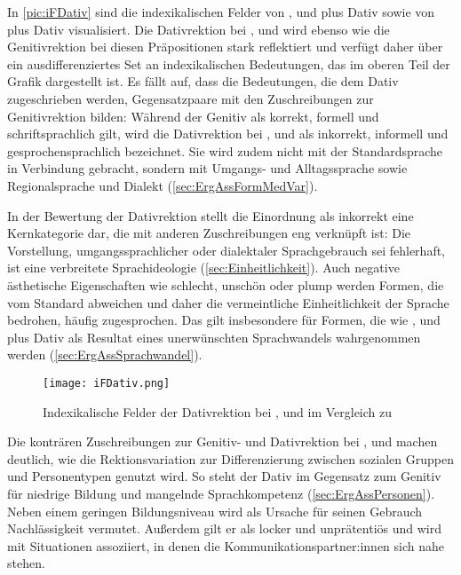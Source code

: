 In \autoref{pic:iFDativ} sind die indexikalischen Felder von \wegen, \waehrend{} und \dank{} plus Dativ sowie von \gegenueber{} plus Dativ visualisiert. 
Die Dativrektion bei \wegen, \waehrend{} und \dank{} wird ebenso wie die Genitivrektion bei diesen Präpositionen stark reflektiert und verfügt daher über ein ausdifferenziertes Set an indexikalischen Bedeutungen, das im oberen Teil der Grafik dargestellt ist. 
Es fällt auf, dass die Bedeutungen, die dem Dativ zugeschrieben werden, Gegensatzpaare mit den Zuschreibungen zur Genitivrektion bilden:
Während der Genitiv als korrekt, formell und schriftsprachlich gilt, wird die Dativrektion bei \wegen, \waehrend{} und \dank{} als inkorrekt, informell und gesprochensprachlich bezeichnet.
Sie wird zudem nicht mit der Standardsprache in Verbindung gebracht, sondern mit Umgangs- und Alltagssprache sowie Regionalsprache und Dialekt (\autoref{sec:ErgAssFormMedVar}). 

In der Bewertung der Dativrektion stellt die Einordnung als inkorrekt eine Kernkategorie dar, die mit anderen Zuschreibungen eng verknüpft ist: 
Die Vorstellung, umgangssprachlicher oder dialektaler Sprachgebrauch sei fehlerhaft, ist eine verbreitete Sprachideologie (\autoref{sec:Einheitlichkeit}). 
Auch negative ästhetische Eigenschaften wie schlecht, unschön oder plump werden Formen, die vom Standard abweichen und daher die vermeintliche Einheitlichkeit der Sprache bedrohen, häufig zugesprochen. 
Das gilt insbesondere für Formen, die wie \wegen, \waehrend{} und \dank{} plus Dativ als Resultat eines unerwünschten Sprachwandels wahrgenommen werden (\autoref{sec:ErgAssSprachwandel}). 

\begin{figure}[hp]
\texttt{[image: iFDativ.png]}
\caption{Indexikalische Felder der Dativrektion bei \wegen, \waehrend{} und \dank{} im Vergleich zu \gegenueber}
\label{pic:iFDativ}
\end{figure}

Die konträren Zuschreibungen zur Genitiv- und Dativrektion bei \wegen, \waehrend{} und \dank{} machen deutlich, wie die Rektionsvariation zur Differenzierung zwischen sozialen Gruppen und Personentypen genutzt wird. 
So steht der Dativ im Gegensatz zum Genitiv für niedrige Bildung und mangelnde Sprachkompetenz (\autoref{sec:ErgAssPersonen}). 
Neben einem geringen Bildungsniveau wird als Ursache für seinen Gebrauch Nachlässigkeit vermutet. 
Außerdem gilt er als locker und unprätentiös und wird mit Situationen assoziiert, in denen die Kommunikationspartner:innen sich nahe stehen. 


